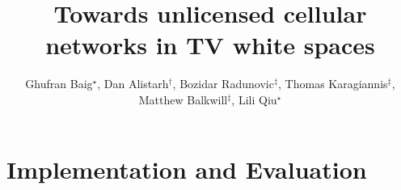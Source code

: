 \documentclass[sigconf]{acmart}
\begin{document}
\title{Towards unlicensed cellular networks in TV white spaces}

%
%
%
%
%

\author{%
Ghufran Baig$^\star$,
Dan Alistarh$^\dagger$,
Bozidar Radunovic$^\ddagger$,
Thomas Karagiannis$^\ddagger$,
Matthew Balkwill$^\ddagger$,
Lili Qiu$^\star$
%
}
 

\renewcommand{\shortauthors}{G. Baig et al.}




\maketitle











\section{Implementation and Evaluation}



















%
\end{document}
